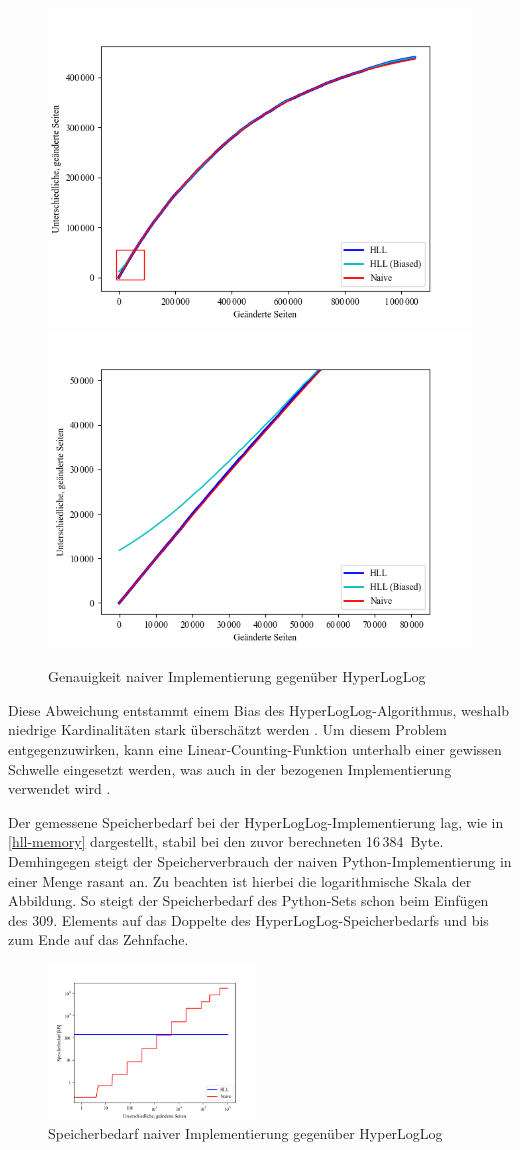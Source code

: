 \begin{figure}[t]
	\centering
	\includegraphics[width=.49\textwidth]{images/hll_count_1.png}
	\includegraphics[width=.49\textwidth]{images/hll_count_2.png}
	\caption{Genauigkeit naiver Implementierung gegenüber HyperLogLog}
	\label{fig:hll-count}
\end{figure}

Diese Abweichung entstammt einem Bias des HyperLogLog-Algorithmus, weshalb niedrige Kardinalitäten stark überschätzt werden \cite{heule2013}.
Um diesem Problem entgegenzuwirken, kann eine Linear-Counting-Funktion unterhalb einer gewissen Schwelle eingesetzt werden, was auch in der bezogenen Implementierung verwendet wird \cite{evseenko2018}.

Der gemessene Speicherbedarf bei der HyperLogLog-Implementierung lag, wie in \autoref{hll-memory} dargestellt, stabil bei den zuvor berechneten 16\,384~Byte.
Demhingegen steigt der Speicherverbrauch der naiven Python-Implementierung in einer Menge rasant an.
Zu beachten ist hierbei die logarithmische Skala der Abbildung.
So steigt der Speicherbedarf des Python-Sets schon beim Einfügen des 309.
Elements auf das Doppelte des HyperLogLog-Speicherbedarfs und bis zum Ende auf das Zehnfache.

\begin{figure}[b!]
	\centering
	\includegraphics[width=0.49\textwidth]{images/hll_memory.png}
	\caption{Speicherbedarf naiver Implementierung gegenüber HyperLogLog}
	\label{fig:hll-memory}
\end{figure}

